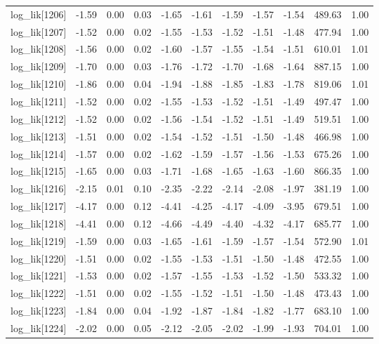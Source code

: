 \begin{table}[ht]
\begin{tabular}{rrrrrrrrrrr}
  log\_lik[1206] & -1.59 & 0.00 & 0.03 & -1.65 & -1.61 & -1.59 & -1.57 & -1.54 & 489.63 & 1.00 \\ 
  log\_lik[1207] & -1.52 & 0.00 & 0.02 & -1.55 & -1.53 & -1.52 & -1.51 & -1.48 & 477.94 & 1.00 \\ 
  log\_lik[1208] & -1.56 & 0.00 & 0.02 & -1.60 & -1.57 & -1.55 & -1.54 & -1.51 & 610.01 & 1.01 \\ 
  log\_lik[1209] & -1.70 & 0.00 & 0.03 & -1.76 & -1.72 & -1.70 & -1.68 & -1.64 & 887.15 & 1.00 \\ 
  log\_lik[1210] & -1.86 & 0.00 & 0.04 & -1.94 & -1.88 & -1.85 & -1.83 & -1.78 & 819.06 & 1.01 \\ 
  log\_lik[1211] & -1.52 & 0.00 & 0.02 & -1.55 & -1.53 & -1.52 & -1.51 & -1.49 & 497.47 & 1.00 \\ 
  log\_lik[1212] & -1.52 & 0.00 & 0.02 & -1.56 & -1.54 & -1.52 & -1.51 & -1.49 & 519.51 & 1.00 \\ 
  log\_lik[1213] & -1.51 & 0.00 & 0.02 & -1.54 & -1.52 & -1.51 & -1.50 & -1.48 & 466.98 & 1.00 \\ 
  log\_lik[1214] & -1.57 & 0.00 & 0.02 & -1.62 & -1.59 & -1.57 & -1.56 & -1.53 & 675.26 & 1.00 \\ 
  log\_lik[1215] & -1.65 & 0.00 & 0.03 & -1.71 & -1.68 & -1.65 & -1.63 & -1.60 & 866.35 & 1.00 \\ 
  log\_lik[1216] & -2.15 & 0.01 & 0.10 & -2.35 & -2.22 & -2.14 & -2.08 & -1.97 & 381.19 & 1.00 \\ 
  log\_lik[1217] & -4.17 & 0.00 & 0.12 & -4.41 & -4.25 & -4.17 & -4.09 & -3.95 & 679.51 & 1.00 \\ 
  log\_lik[1218] & -4.41 & 0.00 & 0.12 & -4.66 & -4.49 & -4.40 & -4.32 & -4.17 & 685.77 & 1.00 \\ 
  log\_lik[1219] & -1.59 & 0.00 & 0.03 & -1.65 & -1.61 & -1.59 & -1.57 & -1.54 & 572.90 & 1.01 \\ 
  log\_lik[1220] & -1.51 & 0.00 & 0.02 & -1.55 & -1.53 & -1.51 & -1.50 & -1.48 & 472.55 & 1.00 \\ 
  log\_lik[1221] & -1.53 & 0.00 & 0.02 & -1.57 & -1.55 & -1.53 & -1.52 & -1.50 & 533.32 & 1.00 \\ 
  log\_lik[1222] & -1.51 & 0.00 & 0.02 & -1.55 & -1.52 & -1.51 & -1.50 & -1.48 & 473.43 & 1.00 \\ 
  log\_lik[1223] & -1.84 & 0.00 & 0.04 & -1.92 & -1.87 & -1.84 & -1.82 & -1.77 & 683.10 & 1.00 \\ 
  log\_lik[1224] & -2.02 & 0.00 & 0.05 & -2.12 & -2.05 & -2.02 & -1.99 & -1.93 & 704.01 & 1.00 \\ 

\end{tabular}
\end{table}
